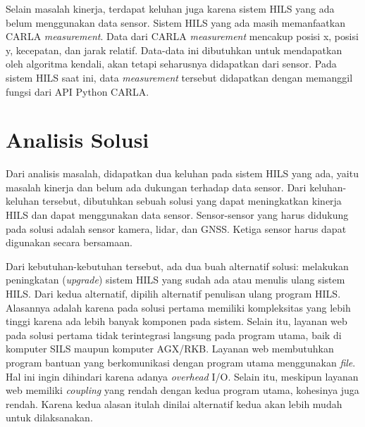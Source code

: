 Selain masalah kinerja, terdapat keluhan juga karena sistem HILS yang ada belum
menggunakan data sensor. Sistem HILS yang ada masih memanfaatkan CARLA
\textit{measurement}. Data dari CARLA \textit{measurement} mencakup posisi x,
posisi y, kecepatan, dan jarak relatif. Data-data ini dibutuhkan untuk
mendapatkan oleh algoritma kendali, akan tetapi seharusnya didapatkan dari
sensor. Pada sistem HILS saat ini, data \textit{measurement} tersebut didapatkan
dengan memanggil fungsi dari API Python CARLA.

\section{Analisis Solusi}

Dari analisis masalah, didapatkan dua keluhan pada sistem HILS yang ada, yaitu
masalah kinerja dan belum ada dukungan terhadap data sensor. Dari
keluhan-keluhan tersebut, dibutuhkan sebuah solusi yang dapat meningkatkan
kinerja HILS dan dapat menggunakan data sensor. Sensor-sensor yang harus
didukung pada solusi adalah sensor kamera, lidar, dan GNSS. Ketiga sensor harus
dapat digunakan secara bersamaan.

Dari kebutuhan-kebutuhan tersebut, ada dua buah alternatif solusi: melakukan
peningkatan (\textit{upgrade}) sistem HILS yang sudah ada atau menulis ulang
sistem HILS. Dari kedua alternatif, dipilih alternatif penulisan ulang program
HILS. Alasannya adalah karena pada solusi pertama memiliki kompleksitas yang
lebih tinggi karena ada lebih banyak komponen pada sistem. Selain itu, layanan
web pada solusi pertama tidak terintegrasi langsung pada program utama, baik di
komputer SILS maupun komputer AGX/RKB. Layanan web membutuhkan program bantuan
yang berkomunikasi dengan program utama menggunakan \textit{file}. Hal ini ingin
dihindari karena adanya \textit{overhead} I/O. Selain itu, meskipun layanan web
memiliki \textit{coupling} yang rendah dengan kedua program utama, kohesinya
juga rendah. Karena kedua alasan itulah dinilai alternatif kedua akan lebih
mudah untuk dilaksanakan.

